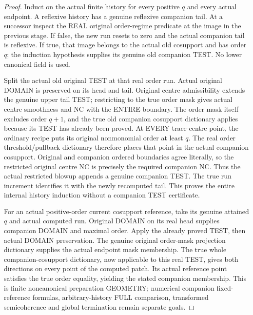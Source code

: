 \begin{proof}
Induct on the actual finite history for every positive $q$ and every actual
endpoint. A reflexive history has a genuine reflexive companion tail. At a
successor inspect the REAL original order-regime predicate at the image in
the previous stage. If false, the new run resets to zero and the actual
companion tail is reflexive. If true, that image belongs to the actual old
cosupport and has order $q$; the induction hypothesis supplies its genuine
old companion TEST. No lower canonical field is used.

Split the actual old original TEST at that real order run. Actual original
DOMAIN is preserved on its head and tail. Original centre admissibility
extends the genuine upper tail TEST; restricting to the true order mask
gives actual centre smoothness and NC with the ENTIRE boundary. The order
mask itself excludes order $q+1$, and the true old companion cosupport
dictionary applies because its TEST has already been proved. At EVERY
trace-centre point, the ordinary recipe puts its original nonmonomial
order at least $q$. The real order threshold/pullback dictionary therefore
places that point in the actual companion cosupport. Original and companion
ordered boundaries agree literally, so the restricted original centre NC
is precisely the required companion NC. Thus the actual restricted blowup
appends a genuine companion TEST. The true run increment identifies it
with the newly recomputed tail. This proves the entire internal history
induction without a companion TEST certificate.

For an actual positive-order current cosupport reference, take its genuine
attained $q$ and actual computed run. Original DOMAIN on its real head
supplies companion DOMAIN and maximal order. Apply the already proved
TEST, then actual DOMAIN preservation. The genuine original order-mask
projection dictionary supplies the actual endpoint mask membership. The
true whole companion-cosupport dictionary, now applicable to this real
TEST, gives both directions on every point of the computed patch. Its
actual reference point satisfies the true order equality, yielding the
stated companion membership. This is finite noncanonical preparation
GEOMETRY; numerical companion fixed-reference formulas, arbitrary-history
FULL comparison, transformed semicoherence and global termination remain
separate goals.
\end{proof}
